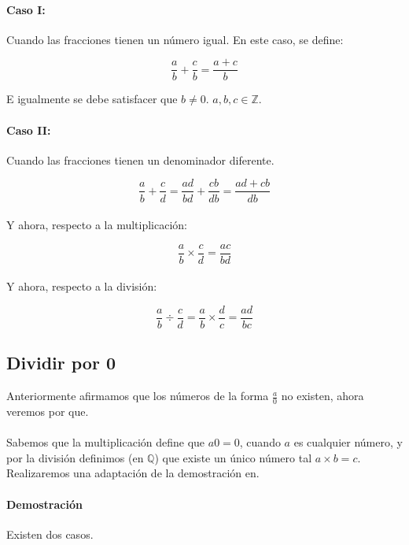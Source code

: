 \documentclass{article}
\begin{document}
\paragraph{Caso I:} Cuando las fracciones tienen un número igual. En este caso, se define:

$$\frac{a}{b} + \frac{c}{b} = \frac{a + c}{b}$$

E igualmente se debe satisfacer que $b \neq 0$. $a, b, c \in \mathbb{Z}$.

\paragraph{Caso II:} Cuando las fracciones tienen un denominador diferente.

$$\frac{a}{b} + \frac{c}{d} = \frac{ad}{bd} + \frac{cb}{db} = \frac{ad + cb}{db}$$

\paragraph{} Y ahora, respecto a la multiplicación:

$$\frac{a}{b} \times \frac{c}{d} = \frac{ac}{bd}$$

\paragraph{} Y ahora, respecto a la división:

$$\frac{a}{b} \div \frac{c}{d} = \frac{a}{b} \times \frac{d}{c} = \frac{ad}{bc}$$

\subsection{Dividir por 0}

Anteriormente afirmamos que los números de la forma $\frac{a}{0}$ no existen, ahora veremos por que.

\paragraph{}Sabemos que la multiplicación define que $a0 = 0$, cuando $a$ es cualquier número, y por la división definimos (en $\mathbb{Q}$) que existe un único número tal $a \times b = c$. Realizaremos una adaptación de la demostración en\cite{brink_1933}.

\paragraph{Demostración} Existen dos casos.
\end{document}
